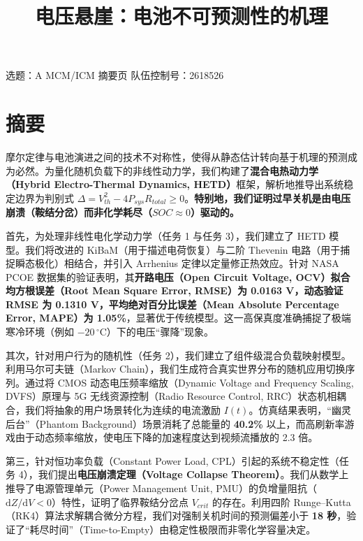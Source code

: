 \documentclass[11pt,a4paper]{ctexart}
\title{电压悬崖：电池不可预测性的机理}
\author{}
\date{}
\begin{document}
\maketitle

\begin{center}
\small 选题：A  MCM/ICM 摘要页 \quad 队伍控制号：2618526
\end{center}
\vspace{0.5em}

\section*{摘要}

摩尔定律与电池演进之间的技术不对称性，使得从静态估计转向基于机理的预测成为必然。为量化随机负载下的非线性动力学，我们构建了\textbf{混合电热动力学（Hybrid Electro-Thermal Dynamics, HETD）}框架，解析地推导出系统稳定边界为判别式 $\Delta = V_{th}^2 - 4P_{sys}R_{total} \ge 0$。\textbf{特别地，我们证明过早关机是由电压崩溃（鞍结分岔）而非化学耗尽（$SOC \approx 0$）驱动的。}

首先，为处理非线性电化学动力学（任务 1 与任务 3），我们建立了 HETD 模型。我们将改进的 KiBaM（用于描述电荷恢复）与二阶 Thevenin 电路（用于捕捉瞬态极化）相结合，并引入 Arrhenius 定律以定量修正热效应。针对 NASA PCOE 数据集的验证表明，其\textbf{开路电压（Open Circuit Voltage, OCV）拟合均方根误差（Root Mean Square Error, RMSE）为 0.0163 V，动态验证 RMSE 为 0.1310 V，平均绝对百分比误差（Mean Absolute Percentage Error, MAPE）为 1.05\%}，显著优于传统模型。这一高保真度准确捕捉了极端寒冷环境（例如 $-20\,^{\circ}\mathrm{C}$）下的电压“骤降”现象。

其次，针对用户行为的随机性（任务 2），我们建立了组件级混合负载映射模型。利用马尔可夫链（Markov Chain），我们生成符合真实世界分布的随机应用切换序列。通过将 CMOS 动态电压频率缩放（Dynamic Voltage and Frequency Scaling, DVFS）原理与 5G 无线资源控制（Radio Resource Control, RRC）状态机相耦合，我们将抽象的用户场景转化为连续的电流激励 $I(t)$。仿真结果表明，“幽灵后台”（Phantom Background）场景消耗了总能量的 \textbf{40.2\%} 以上，而高刷新率游戏由于动态频率缩放，使电压下降的加速程度达到视频流播放的 2.3 倍。

第三，针对恒功率负载（Constant Power Load, CPL）引起的系统不稳定性（任务 4），我们提出\textbf{电压崩溃定理（Voltage Collapse Theorem）}。我们从数学上推导了电源管理单元（Power Management Unit, PMU）的负增量阻抗（$\mathrm{d}Z/\mathrm{d}V < 0$）特性，证明了临界鞍结分岔点 $V_{crit}$ 的存在。利用四阶 Runge--Kutta（RK4）算法求解耦合微分方程，我们对强制关机时间的预测偏差小于 \textbf{18 秒}，验证了“耗尽时间”（Time-to-Empty）由稳定性极限而非零化学容量决定。
\end{document}
